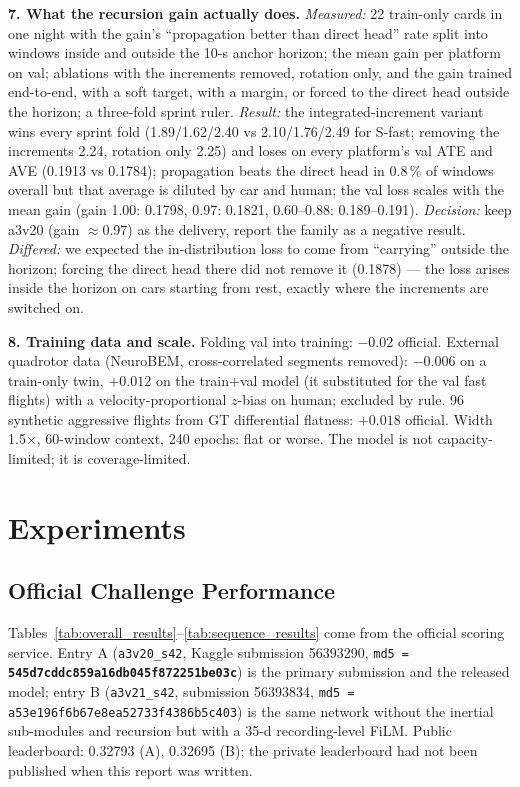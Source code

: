 \documentclass[letterpaper,10pt,conference]{ieeeconf}
\begin{document}
\textbf{7. What the recursion gain actually does.} \emph{Measured:} 22 train-only cards in one
night with the gain's ``propagation better than direct head'' rate split into windows inside and
outside the 10-s anchor horizon; the mean gain per platform on val; ablations with the increments
removed, rotation only, and the gain trained end-to-end, with a soft target, with a margin, or
forced to the direct head outside the horizon; a three-fold sprint ruler. \emph{Result:} the
integrated-increment variant wins every sprint fold (1.89/1.62/2.40 vs 2.10/1.76/2.49 for S-fast;
removing the increments 2.24, rotation only 2.25) and loses on every platform's val ATE and AVE
(0.1913 vs 0.1784); propagation beats the direct head in 0.8\,\% of windows overall but that
average is diluted by car and human; the val loss scales with the mean gain (gain 1.00: 0.1798,
0.97: 0.1821, 0.60--0.88: 0.189--0.191). \emph{Decision:} keep a3v20 (gain $\approx$0.97) as the
delivery, report the family as a negative result. \emph{Differed:} we expected the in-distribution
loss to come from ``carrying'' outside the horizon; forcing the direct head there did not remove it
(0.1878) --- the loss arises inside the horizon on cars starting from rest, exactly where the
increments are switched on.

\textbf{8. Training data and scale.} Folding val into training: $-0.02$ official. External
quadrotor data (NeuroBEM, cross-correlated segments removed): $-0.006$ on a train-only twin,
$+0.012$ on the train+val model (it substituted for the val fast flights) with a
velocity-proportional $z$-bias on human; excluded by rule. 96 synthetic aggressive flights from
GT differential flatness: $+0.018$ official. Width 1.5$\times$, 60-window context, 240 epochs: flat
or worse. The model is not capacity-limited; it is coverage-limited.

\section{Experiments}

\subsection{Official Challenge Performance}
Tables~\ref{tab:overall_results}--\ref{tab:sequence_results} come from the official scoring
service. Entry A (\texttt{a3v20\_s42}, Kaggle submission 56393290,
\texttt{md5 = \textbf{545d7cddc859a16db045f872251be03c}}) is the primary submission and the released
model; entry B (\texttt{a3v21\_s42}, submission 56393834,
\texttt{md5 = a53e196f6b67e8ea52733f4386b5c403}) is the same network without the inertial
sub-modules and recursion but with a 35-d recording-level FiLM. Public leaderboard: 0.32793 (A),
0.32695 (B); the private leaderboard had not been published when this report was written.
\end{document}
